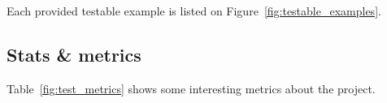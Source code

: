Each provided testable example is listed on Figure~\ref{fig:testable_examples}.

\vspace{\baselineskip}


\subsection{Stats \& metrics}
Table~\ref{fig:test_metrics} shows some interesting metrics about the project.

\vspace{\baselineskip}
